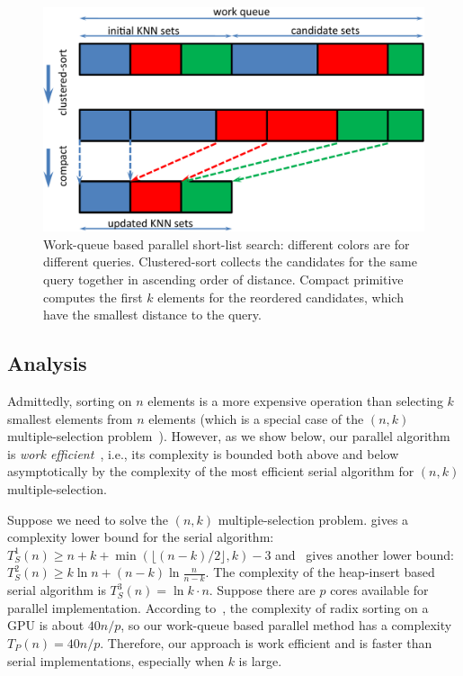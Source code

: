 \begin{figure}[!htb]
  \centering
  \includegraphics[width=0.8\linewidth]{figs/6/workqueue.pdf}
  \caption[Work-queue based parallel short-list search]{\label{fig:6:workqueue} Work-queue based parallel short-list search: different colors are for different queries. Clustered-sort collects the candidates for the same query together in ascending order of distance. Compact primitive computes the first $k$ elements for the reordered candidates, which have the smallest distance to the query. }
\end{figure}

\subsection{Analysis}

Admittedly, sorting on $n$ elements is a more expensive operation than selecting $k$ smallest elements from $n$ elements (which is a special case of the $(n,k)$ multiple-selection problem~\cite{Knuth:1998:ACP}). However, as we show below, our parallel algorithm is \emph{work efficient}~\cite{Joesphbook}, i.e., its complexity is bounded both above and below asymptotically by the complexity of the most efficient serial algorithm for $(n,k)$ multiple-selection.

Suppose we need to solve the $(n,k)$ multiple-selection problem. \cite{Knuth:1998:ACP} gives a complexity lower bound for the serial algorithm: $T_S^1(n) \geq n + k + \min(\lfloor (n-k)/2\rfloor, k) -3$
and~\cite{Kaligosi:2005} gives another lower bound: $T_S^2(n) \geq k \ln n + (n-k)\ln\frac{n}{n-k}$.
The complexity of the heap-insert based serial algorithm is $T_S^3(n) = \ln k \cdot n$.
Suppose there are $p$ cores available for parallel implementation. According to~\cite{Merrill:2010:RSG}, the complexity of radix sorting on a GPU is about $40 n / p$, so our work-queue based parallel method has a complexity $T_P(n) = 40 n / p$.
Therefore, our approach is work efficient and is faster than serial implementations, especially when $k$ is large.

